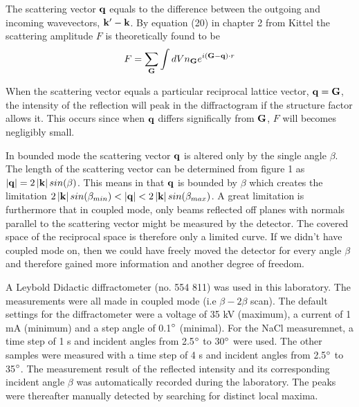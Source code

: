 \documentclass[a4paper,twoside=false,abstract=false,numbers=noenddot,
titlepage=false,headings=small,parskip=half,version=last]{scrartcl}
\begin{document}
The scattering vector $\bold{q}$ equals to the difference between the outgoing and incoming wavevectors,
$\bold{k}' - \bold{k}$. By equation (20) in chapter 2 from Kittel \cite{Kittel} the scattering
amplitude $F$ is theoretically found to be
\begin{equation}
    \label{eq:scatamp}
    F = \sum_\bold{G} \int dV n_{\bold{G}} e^{i(\bold{G}-\bold{q})\cdot r}
\end{equation}

When the scattering vector equals a particular reciprocal lattice vector, $\bold{q} = \bold{G}$, the intensity of the reflection will peak in the diffractogram if the structure factor allows it.
This occurs since when $\bold{q}$ differs significally from $\bold{G}$, $F$ will becomes negligibly small.


In bounded mode the scattering vector $\bold{q}$ is altered only by the single angle $\beta$.
The length of the scattering vector can be determined from figure 1 as $\left\vert \bold{q} \right\vert = 2 \left\vert \bold{k} \right\vert sin(\beta)$.
This means in that $\bold{q}$ is bounded by $\beta$ which creates the limitation $2 \left\vert \bold{k} \right\vert sin(\beta_{min}) < \left\vert \bold{q} \right\vert < 2 \left\vert \bold{k} \right\vert sin(\beta_{max})$.
A great limitation is furthermore that in coupled mode, only beams reflected off planes with normals parallel to the scattering vector might be measured by the detector. The covered space of the reciprocal space is therefore only a limited curve.
If we didn't have coupled mode on, then we could have freely moved the detector for every angle $\beta$ and therefore gained more information and another degree of freedom.


A Leybold Didactic diffractometer (no. 554 811) was used in this laboratory. The measurements were all made in coupled mode (i.e $\beta-2\beta$ scan). The default settings for the diffractometer were a voltage of 35 kV (maximum), a current of 1 mA (minimum) and a step angle of 0.1$\degree$ (minimal). For the NaCl measuremnet, a time step of 1 s and incident angles from 2.5$\degree$ to 30$\degree$ were used. The other samples were measured with a time step of 4 s and incident angles from 2.5$\degree$ to 35$\degree$. The measurement result of the reflected intensity and its corresponding incident angle $\beta$ was automatically recorded during the laboratory. The peaks were thereafter manually detected by searching for distinct local maxima.
\end{document}
